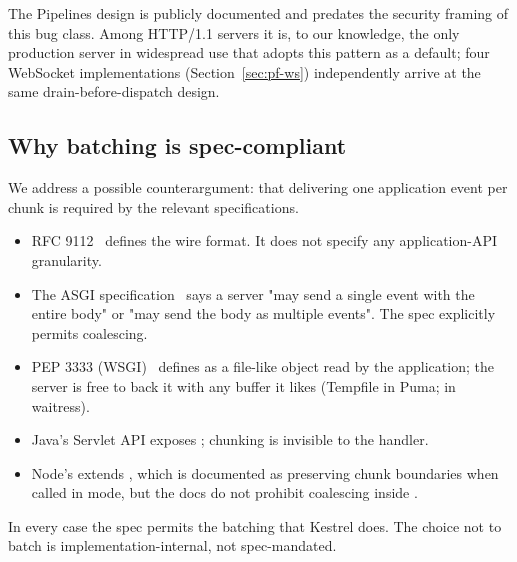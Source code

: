 The Pipelines design is publicly documented and predates the
security framing of this bug class. Among HTTP/1.1 servers it is,
to our knowledge, the only production server in widespread use
that adopts this pattern as a default; four WebSocket
implementations (Section~\ref{sec:pf-ws}) independently arrive at
the same drain-before-dispatch design.

\subsection{Why batching is spec-compliant}
\label{sec:rc-spec}

We address a possible counterargument: that delivering one
application event per chunk is required by the relevant
specifications.

\begin{itemize}
  \item RFC 9112~\cite{rfc9112} defines the wire format. It
    does not specify any application-API granularity.
  \item The ASGI specification~\cite{asgi_spec} says a server
    "may send a single  event with the entire
    body" or "may send the body as multiple
     events". The spec explicitly permits
    coalescing.
  \item PEP 3333 (WSGI)~\cite{wsgi_pep3333} defines
     as a file-like object read by
    the application; the server is free to back it with any
    buffer it likes (Tempfile in Puma;  in
    waitress).
  \item Java's Servlet API exposes ;
    chunking is invisible to the handler.
  \item Node's  extends
    , which is documented as preserving chunk
    boundaries when called in  mode, but the docs
    do not prohibit coalescing inside .
\end{itemize}

In every case the spec permits the batching that Kestrel does.
The choice not to batch is implementation-internal, not
spec-mandated.
